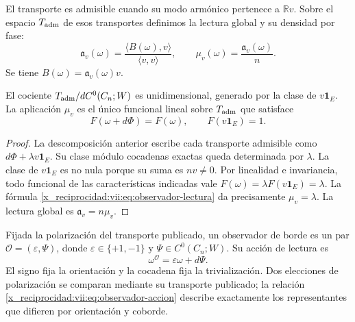 \begin{definition}
\label{x_reciprocidad:vii:def:observador-admisible}
El transporte es admisible cuando su modo armónico pertenece a
\(\mathbb Rv\). Sobre el espacio \(\mathcal T_{\rm adm}\) de esos
transportes definimos la lectura global y su densidad por fase:
\begin{equation}
 \mathfrak a_v(\omega)
 =\frac{\langle B(\omega),v\rangle}{\langle v,v\rangle},
 \qquad
 \mu_v(\omega)=\frac{\mathfrak a_v(\omega)}n.
 \label{x_reciprocidad:vii:eq:observador-lectura}
\end{equation}
Se tiene \(B(\omega)=\mathfrak a_v(\omega)v\).
\end{definition}

\begin{theorem}
\label{x_reciprocidad:vii:thm:observador-unicidad}
El cociente
\(\mathcal T_{\rm adm}/dC^0(C_n;W)\) es unidimensional, generado
por la clase de \(v\mathbf1_E\). La aplicación \(\mu_v\) es el
único funcional lineal sobre \(\mathcal T_{\rm adm}\) que satisface
\[
 F(\omega+d\Phi)=F(\omega),\qquad F(v\mathbf1_E)=1.
\]
\end{theorem}

\begin{proof}
La descomposición anterior escribe cada transporte admisible como
\(d\Phi+\lambda v\mathbf1_E\). Su clase módulo cocadenas exactas
queda determinada por \(\lambda\). La clase de \(v\mathbf1_E\)
es no nula porque su suma es \(nv\neq0\). Por linealidad e
invariancia, todo funcional de las características indicadas vale
\(F(\omega)=\lambda F(v\mathbf1_E)=\lambda\). La fórmula
\eqref{x_reciprocidad:vii:eq:observador-lectura} da precisamente \(\mu_v=\lambda\).
La lectura global es \(\mathfrak a_v=n\mu_v\).
\end{proof}

\begin{definition}
\label{x_reciprocidad:vii:def:observador-borde}
Fijada la polarización del transporte publicado, un observador de borde
es un par \(\mathcal O=(\varepsilon,\Psi)\), donde
\(\varepsilon\in\{+1,-1\}\) y \(\Psi\in C^0(C_n;W)\).
Su acción de lectura es
\begin{equation}
 \omega^{\mathcal O}=\varepsilon\omega+d\Psi.
 \label{x_reciprocidad:vii:eq:observador-accion}
\end{equation}
El signo fija la orientación y la cocadena fija la trivialización.
Dos elecciones de polarización se comparan mediante su transporte
publicado; la relación \eqref{x_reciprocidad:vii:eq:observador-accion} describe
exactamente los representantes que difieren por orientación y coborde.
\end{definition}

